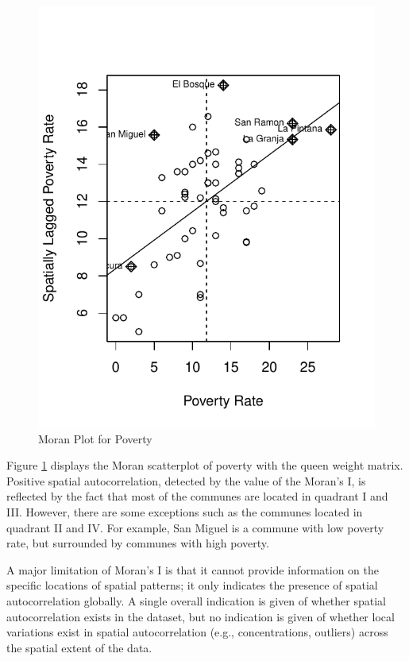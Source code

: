 \begin{figure}[ht]
\caption{Moran Plot for Poverty}\label{fig:mp-poverty}
\begin{knitrout}
\color{fgcolor}

{\centering \includegraphics[width=\maxwidth]{figure/moran-plotT-1} 

}


\end{knitrout}
\end{figure}

Figure \ref{fig:mp-poverty} displays the Moran scatterplot of poverty with the queen weight matrix. Positive spatial autocorrelation, detected by the value of the Moran's I, is reflected by the fact that most of the communes are located in quadrant I and III. However, there are some exceptions such as the communes located in quadrant II and IV. For example, San Miguel is a commune with low poverty rate, but surrounded by communes with high poverty.  

A major limitation of Moran's I is that it cannot provide information on the specific locations of spatial patterns; it only indicates the presence of spatial autocorrelation globally. A single overall indication is given of whether spatial autocorrelation exists in the dataset, but no indication is given of whether local variations exist in spatial autocorrelation (e.g., concentrations, outliers) across the spatial extent of the data. 


